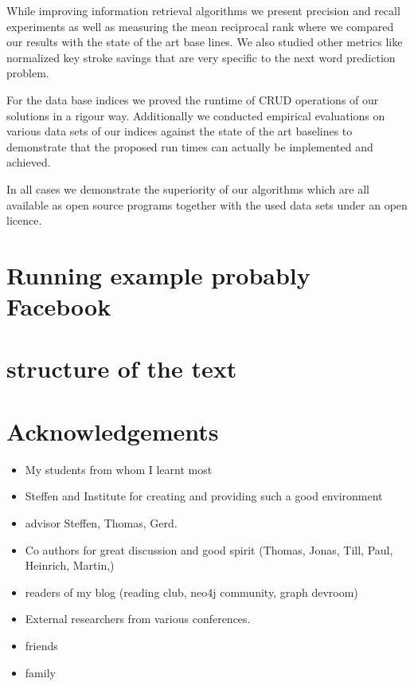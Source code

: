 \documentclass[•]{book}
\begin{document}
While improving information retrieval algorithms we present precision and recall experiments as well as measuring the mean reciprocal rank where we compared our results with the state of the art base lines. 
We also studied other metrics like normalized key stroke savings that are very specific to the next word prediction problem.

For the data base indices we proved the runtime of CRUD operations of our solutions in a rigour way. 
Additionally we conducted empirical evaluations on various data sets of our indices against the state of the art baselines to demonstrate that the proposed run times can actually be implemented and achieved.

In all cases we demonstrate the superiority of our algorithms which are all available as open source programs together with the used data sets under an open licence.
\section{Running example probably Facebook}

\section{structure of the text}

\section{Acknowledgements}
\begin{itemize}
\item My students from whom I learnt most
\item Steffen and Institute for creating and providing such a good environment
\item advisor Steffen, Thomas, Gerd.
\item Co authors for great discussion and good spirit (Thomas, Jonas, Till, Paul, Heinrich, Martin,)
\item readers of my blog (reading club, neo4j community, graph devroom)
\item External researchers from various conferences.
\item friends
\item family 

\end{itemize}

\end{document}
